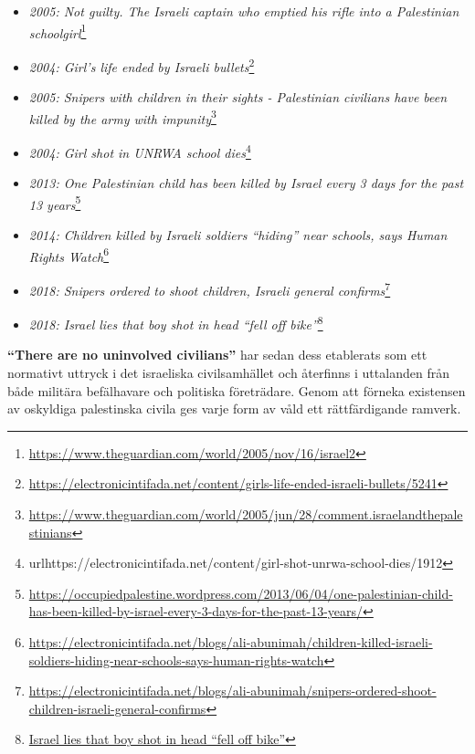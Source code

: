 \begin{itemize}
    \item \textit{2005: Not guilty. The Israeli captain who emptied his rifle into a Palestinian schoolgirl}\footnote{\url{https://www.theguardian.com/world/2005/nov/16/israel2}}
    
    \item \textit{2004: Girl’s life ended by Israeli bullets}\footnote{\url{https://electronicintifada.net/content/girls-life-ended-israeli-bullets/5241}}

    \item \textit{2005: Snipers with children in their sights - Palestinian civilians have been killed by the army with impunity}\footnote{\url{https://www.theguardian.com/world/2005/jun/28/comment.israelandthepalestinians}}

    \item \textit{2004: Girl shot in UNRWA school dies}\footnote{url{https://electronicintifada.net/content/girl-shot-unrwa-school-dies/1912}}

    \item \textit{2013: One Palestinian child has been killed by Israel every 3 days for the past 13 years}\footnote{\url{https://occupiedpalestine.wordpress.com/2013/06/04/one-palestinian-child-has-been-killed-by-israel-every-3-days-for-the-past-13-years/}}

    \item \textit{2014: Children killed by Israeli soldiers “hiding” near schools, says Human Rights Watch}\footnote{\url{https://electronicintifada.net/blogs/ali-abunimah/children-killed-israeli-soldiers-hiding-near-schools-says-human-rights-watch}}
    
    \item \textit{2018: Snipers ordered to shoot children, Israeli general confirms}\footnote{\url{https://electronicintifada.net/blogs/ali-abunimah/snipers-ordered-shoot-children-israeli-general-confirms}}
    
    \item \textit{2018: Israel lies that boy shot in head “fell off bike”}\footnote{\url{Israel lies that boy shot in head “fell off bike”}}

\end{itemize}


\textbf{“There are no uninvolved civilians”} har sedan dess etablerats som ett normativt uttryck i det israeliska civilsamhället och återfinns i uttalanden från både militära befälhavare och politiska företrädare. Genom att förneka existensen av oskyldiga palestinska civila ges varje form av våld ett rättfärdigande ramverk.

